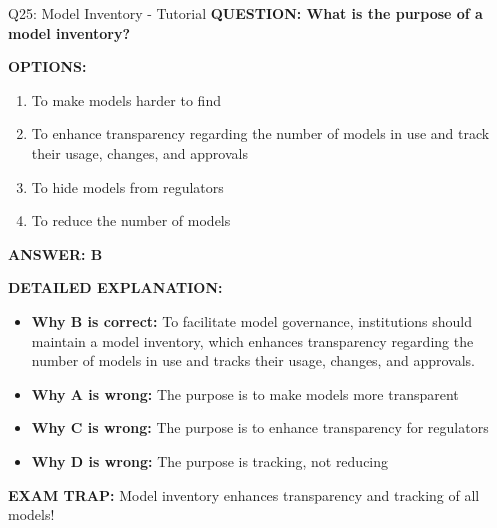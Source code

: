 \documentclass[8pt]{beamer}
\begin{document}
	\begin{frame}{Q25: Model Inventory - Tutorial}
		\fontsize{6.5}{7.5}\selectfont
		\textbf{QUESTION: What is the purpose of a model inventory?}
		
		\vspace{0.1cm}
		\textbf{OPTIONS:}
		\begin{enumerate}
			\item To make models harder to find
			\item To enhance transparency regarding the number of models in use and track their usage, changes, and approvals
			\item To hide models from regulators
			\item To reduce the number of models
		\end{enumerate}
		
		\vspace{0.1cm}
		\textcolor{myblue}{\textbf{ANSWER: B}}
		
		\vspace{0.1cm}
		\textbf{DETAILED EXPLANATION:}
		\begin{itemize}
			\item \textbf{Why B is correct:} To facilitate model governance, institutions should maintain a model inventory, which enhances transparency regarding the number of models in use and tracks their usage, changes, and approvals.
			\item \textbf{Why A is wrong:} The purpose is to make models more transparent
			\item \textbf{Why C is wrong:} The purpose is to enhance transparency for regulators
			\item \textbf{Why D is wrong:} The purpose is tracking, not reducing
		\end{itemize}
		
		\textcolor{myred}{\textbf{EXAM TRAP:}} Model inventory enhances \textcolor{myblue}{transparency and tracking} of all models!
	\end{frame}
	
\end{document}
